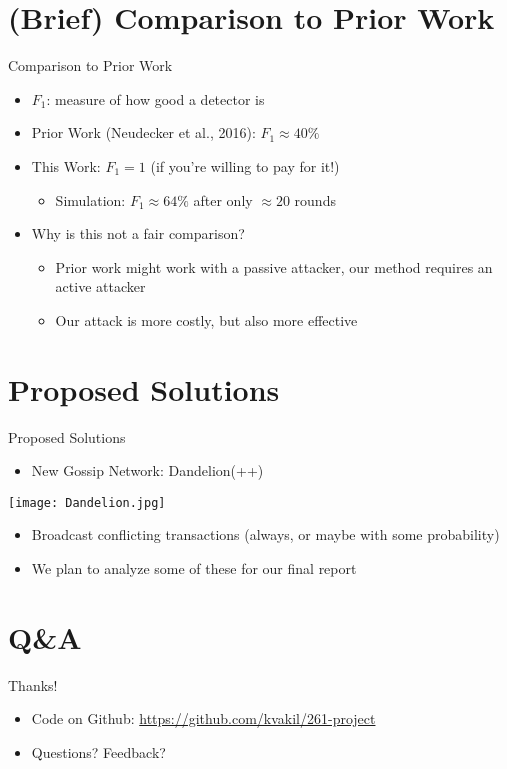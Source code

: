 \documentclass{beamer}
\begin{document}
\section{(Brief) Comparison to Prior Work}
\begin{frame}{Comparison to Prior Work}
\begin{itemize}
    \item $F_1$: measure of how good a detector is \pause
    \item Prior Work (Neudecker et al., 2016): $F_1 \approx 40\%$ \pause
    \item This Work: $F_1 = 1$ (if you're willing to pay for it!) \pause
    \begin{itemize}
        \item Simulation: $F_1 \approx 64\%$ after only $\approx 20$ rounds
    \end{itemize}\pause
    \item Why is this not a fair comparison?\pause
    \begin{itemize}
        \item Prior work might work with a passive attacker, our method requires an active attacker \pause
        \item Our attack is more costly, but also more effective
    \end{itemize}
\end{itemize}
\end{frame}

\section{Proposed Solutions}
\begin{frame}{Proposed Solutions}
\begin{itemize}
    \item New Gossip Network: Dandelion(++)\pause
\end{itemize}
\begin{center}\texttt{[image: Dandelion.jpg]}\end{center}\pause
\begin{itemize}
    \item Broadcast conflicting transactions (always, or maybe with some probability)\pause
    \item We plan to analyze some of these for our final report
\end{itemize}
\end{frame}


\section{Q\&{}A}
\begin{frame}{Thanks!}
    \begin{itemize}
        \item Code on Github: \url{https://github.com/kvakil/261-project}
        \item Questions? Feedback?
    \end{itemize}
\end{frame}
\end{document}
